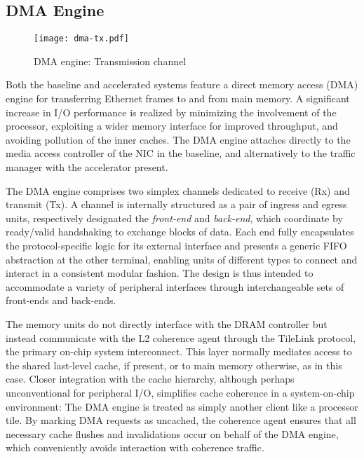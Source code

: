 \subsection{DMA Engine}
\begin{figure}[t]
\begin{center}
\texttt{[image: dma-tx.pdf]}
\caption{DMA engine: Transmission channel}
\label{fig:dma-tx}

\end{center}
\end{figure}


Both the baseline and accelerated systems feature a direct memory access
(DMA) engine for transferring Ethernet frames to and from main memory.
A significant increase in I/O performance is realized by minimizing the
involvement of the processor, exploiting a wider memory interface for
improved throughput, and avoiding pollution of the inner caches.
The DMA engine attaches directly to the media access controller of the
NIC in the baseline, and alternatively to the traffic manager with the
accelerator present.

The DMA engine comprises two simplex channels dedicated to receive (Rx)
and transmit (Tx).
A channel is internally structured as a pair of ingress and egress
units, respectively designated the \emph{front-end} and \emph{back-end},
which coordinate by ready/valid handshaking to exchange blocks of data.
Each end fully encapsulates the protocol-specific logic for its
external interface and presents a generic FIFO abstraction at the other
terminal, enabling units of different types to connect and interact in a
consistent modular fashion.
The design is thus intended to accommodate a variety of peripheral
interfaces through interchangeable sets of front-ends and back-ends.

The memory units do not directly interface with the DRAM controller but
instead communicate with the L2 coherence agent through the TileLink
protocol, the primary on-chip system interconnect.
This layer normally mediates access to the shared last-level cache, if
present, or to main memory otherwise, as in this case.
Closer integration with the cache hierarchy, although perhaps
unconventional for peripheral I/O, simplifies cache coherence in a
system-on-chip environment:
The DMA engine is treated as simply another client like a processor
tile.
By marking DMA requests as uncached, the coherence agent ensures that
all necessary cache flushes and invalidations occur on behalf of the DMA
engine, which conveniently avoids interaction with coherence traffic.

